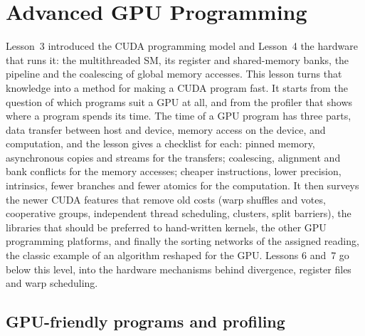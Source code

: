 \documentclass[../main.tex]{subfiles}
\begin{document}
\chapter{Advanced GPU Programming}

Lesson~3 introduced the CUDA programming model and Lesson~4 the hardware
that runs it: the multithreaded SM, its register and shared-memory
banks, the pipeline and the coalescing of global memory accesses.  This
lesson turns that knowledge into a method for making a CUDA program
fast.  It starts from the question of which programs suit a GPU at all,
and from the profiler that shows where a program spends its time.  The
time of a GPU program has three parts, data transfer between host and
device, memory access on the device, and computation, and the lesson
gives a checklist for each: pinned memory, asynchronous copies and
streams for the transfers; coalescing, alignment and bank conflicts for
the memory accesses; cheaper instructions, lower precision, intrinsics,
fewer branches and fewer atomics for the computation.  It then surveys
the newer CUDA features that remove old costs (warp shuffles and votes,
cooperative groups, independent thread scheduling, clusters, split
barriers), the libraries that should be preferred to hand-written
kernels, the other GPU programming platforms, and finally the sorting
networks of the assigned reading, the classic example of an algorithm
reshaped for the GPU.  Lessons 6 and~7 go below this level, into the
hardware mechanisms behind divergence, register files and warp
scheduling.

\section{GPU-friendly programs and profiling}
\label{sec:l05-profiling}
\end{document}
